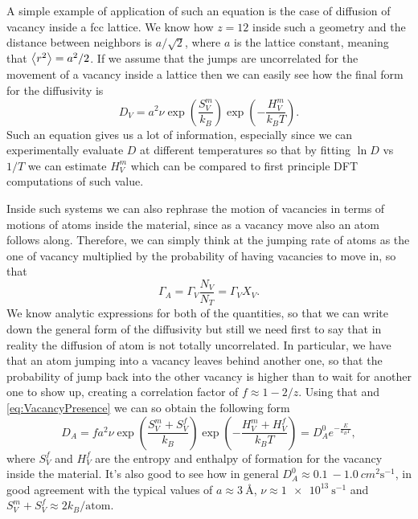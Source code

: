 {
    A simple example of application of such an equation is the case of diffusion of vacancy inside a fcc lattice. We know how $z = 12$ inside such a geometry and the distance between neighbors is $a/\sqrt{2}$, where $a$ is the lattice constant, meaning that $\left\langle r^2 \right\rangle = a^2/2$. If we assume that the jumps are uncorrelated for the movement of a vacancy inside a lattice then we can easily see how the final form for the diffusivity is
    \begin{equation}
        D_V = a^2 \nu \exp\left( \frac{S^m_V}{k_B} \right)\exp\left( -\frac{H^m_V}{k_BT} \right).
    \end{equation}
    Such an equation gives us a lot of information, especially since we can experimentally evaluate $D$ at different temperatures so that by fitting $\ln D$ vs $1/T$ we can estimate $H^m_V$ which can be compared to first principle DFT computations of such value.

    Inside such systems we can also rephrase the motion of vacancies in terms of motions of atoms inside the material, since as a vacancy move also an atom follows along. Therefore, we can simply think at the jumping rate of atoms as the one of vacancy multiplied by the probability of having vacancies to move in, so that
    \begin{equation}
        \Gamma_A = \Gamma_V \frac{N_V}{N_T} = \Gamma_V X_V.
    \end{equation}
    We know analytic expressions for both of the quantities, so that we can write down the general form of the diffusivity but still we need first to say that in reality the diffusion of atom is not totally uncorrelated. In particular, we have that an atom jumping into a vacancy leaves behind another one, so that the probability of jump back into the other vacancy is higher than to wait for another one to show up, creating a correlation factor of $f \approx 1 - 2/z$. Using that and \eqref{eq:VacancyPresence} we can so obtain the following form
    \begin{equation}
        \label{eq:SelfDiffCoeff}
        D_A = fa^2\nu\exp\left( \frac{S_V^m + S_V^f}{k_B} \right)\exp\left( -\frac{H_V^m + H_V^f}{k_BT} \right) = D_A^0e^{-\frac{E}{k_BT}},
    \end{equation}
    where $S_V^f$ and $H_V^f$ are the entropy and enthalpy of formation for the vacancy inside the material. It's also good to see how in general $D_A^0 \approx \SI{0.1}{}-\SI{1.0}{cm^2\second^{-1}}$, in good agreement with the typical values of $a \approx \SI{3}{\angstrom}$, $\nu \approx \SI{1e13}{\second^{-1}}$ and $S_V^m + S_V^f \approx 2k_B/\text{atom}$. 
}
